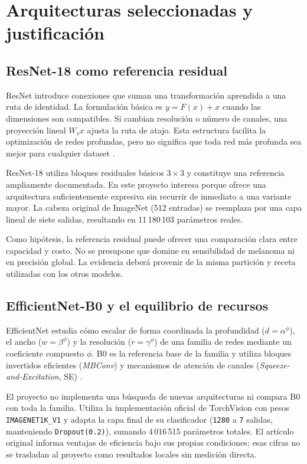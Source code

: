 \FloatBarrier\section{Arquitecturas seleccionadas y justificación}

\subsection{ResNet-18 como referencia residual}
ResNet introduce conexiones que suman una transformación aprendida a una ruta de identidad. La formulación básica es $y=F(x)+x$ cuando las dimensiones son compatibles. Si cambian resolución o número de canales, una proyección lineal $W_s x$ ajusta la ruta de atajo. Esta estructura facilita la optimización de redes profundas, pero no significa que toda red más profunda sea mejor para cualquier dataset \cite{he2016}.

ResNet-18 utiliza bloques residuales básicos $3\times 3$ y constituye una referencia ampliamente documentada. En este proyecto interesa porque ofrece una arquitectura suficientemente expresiva sin recurrir de inmediato a una variante mayor. La cabeza original de ImageNet (512 entradas) se reemplaza por una capa lineal de siete salidas, resultando en 11\,180\,103 parámetros reales.

Como hipótesis, la referencia residual puede ofrecer una comparación clara entre capacidad y costo. No se presupone que domine en sensibilidad de melanoma ni en precisión global. La evidencia deberá provenir de la misma partición y receta utilizadas con los otros modelos.

\subsection{EfficientNet-B0 y el equilibrio de recursos}
EfficientNet estudia cómo escalar de forma coordinada la profundidad ($d=\alpha^\phi$), el ancho ($w=\beta^\phi$) y la resolución ($r=\gamma^\phi$) de una familia de redes mediante un coeficiente compuesto $\phi$. B0 es la referencia base de la familia y utiliza bloques invertidos eficientes (\textit{MBConv}) y mecanismos de atención de canales (\textit{Squeeze-and-Excitation}, SE) \cite{tan2019}.

El proyecto no implementa una búsqueda de nuevas arquitecturas ni compara B0 con toda la familia. Utiliza la implementación oficial de TorchVision con pesos \texttt{IMAGENET1K\_V1} y adapta la capa final de su clasificador (\texttt{1280} a \texttt{7} salidas, manteniendo \texttt{Dropout(0.2)}), sumando 4\,016\,515 parámetros totales. El artículo original informa ventajas de eficiencia bajo sus propias condiciones; esas cifras no se trasladan al proyecto como resultados locales sin medición directa.

